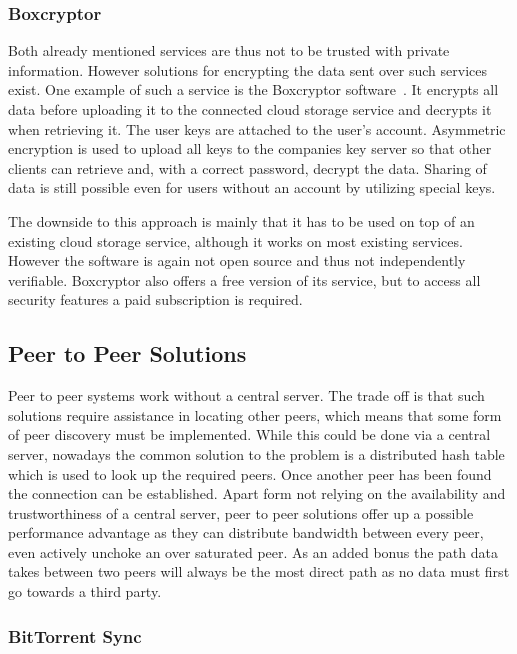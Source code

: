 \subsubsection{Boxcryptor}

Both already mentioned services are thus not to be trusted with private information.
However solutions for encrypting the data sent over such services exist.
One example of such a service is the Boxcryptor software~\cite{web:site:boxcryptor}.
It encrypts all data before uploading it to the connected cloud storage service and decrypts it when retrieving it.
The user keys are attached to the user's account.
Asymmetric encryption is used to upload all keys to the companies key server so that other clients can retrieve and, with a correct password, decrypt the data.
Sharing of data is still possible even for users without an account by utilizing special keys.

The downside to this approach is mainly that it has to be used on top of an existing cloud storage service, although it works on most existing services.
However the software is again not open source and thus not independently verifiable.
Boxcryptor also offers a free version of its service, but to access all security features a paid subscription is required.

\subsection{Peer to Peer Solutions}

Peer to peer systems work without a central server.
The trade off is that such solutions require assistance in locating other peers, which means that some form of peer discovery must be implemented.
While this could be done via a central server, nowadays the common solution to the problem is a distributed hash table which is used to look up the required peers.
Once another peer has been found the connection can be established.
Apart form not relying on the availability and trustworthiness of a central server, peer to peer solutions offer up a possible performance advantage as they can distribute bandwidth between every peer, even actively unchoke an over saturated peer.
As an added bonus the path data takes between two peers will always be the most direct path as no data must first go towards a third party.

\subsubsection{BitTorrent Sync}

